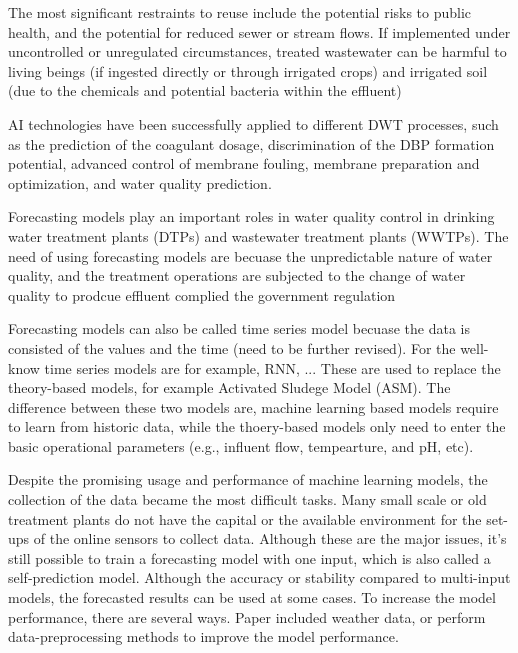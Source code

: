 The most significant restraints to reuse include the potential risks to public health, and the potential for reduced sewer or stream flows. If implemented under uncontrolled or unregulated circumstances, treated wastewater can be harmful to living beings (if ingested directly or through irrigated crops) and irrigated soil (due to the chemicals and potential bacteria within the effluent)




AI technologies have been successfully applied to different DWT processes, such as the prediction of the coagulant 
dosage, discrimination of the DBP formation potential, advanced control of membrane fouling, membrane preparation 
and optimization, and water quality prediction. \cite{liRecentAdvancesArtificial2021}




Forecasting models play an important roles in water quality control in drinking water treatment plants (DTPs) 
and wastewater treatment plants (WWTPs). The need of using forecasting models are becuase the unpredictable 
nature of water quality, and the treatment operations are subjected to the change of water quality to prodcue
effluent complied the government regulation \cite{chenAssessingWastewaterReclamation2003}

Forecasting models can also be called time series model becuase the data is consisted of the values and the 
time (need to be further revised). For the well-know time series models are for example, RNN, ... These are 
used to replace the theory-based models, for example Activated Sludege Model (ASM). The difference between 
these two models are, machine learning based models require to learn from historic data, while the thoery-based
models only need to enter the basic operational parameters (e.g., influent flow, tempearture, and pH, etc).

Despite the promising usage and performance of machine learning models, the collection of the data became
the most difficult tasks. Many small scale or old treatment plants do not have the capital or the available
environment for the set-ups of the online sensors to collect data.
Although these are the major issues, it's still possible to train a forecasting model with one input, which 
is also called a self-prediction model. Although the accuracy or stability compared to multi-input models, 
the forecasted results can be used at some cases. To increase the model performance, there are several ways.
Paper included weather data, or perform data-preprocessing methods to improve the model performance.

